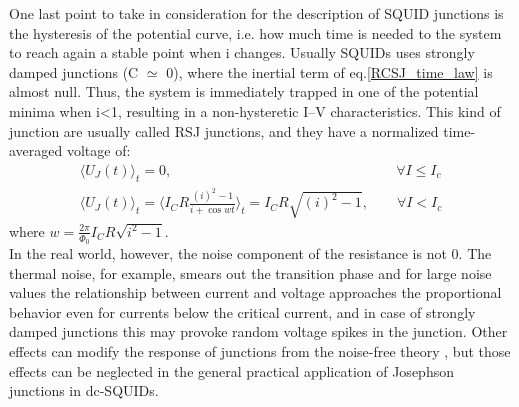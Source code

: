 \documentclass[12pt,a4paper]{report}
\begin{document}
    One last point to take in consideration for the description of SQUID junctions is the hysteresis of the potential curve, i.e. how much time is needed to the system to reach again a stable point when i changes. Usually SQUIDs uses strongly damped junctions (C $\simeq$ 0), where the inertial term of eq.\ref{RCSJ_time_law} is almost null. Thus, the system is immediately trapped in one of the potential minima when i<1, resulting in a  non-hysteretic I–V characteristics. This kind of junction are usually called RSJ junctions, and they have a normalized time-averaged voltage of:
    \begin{eqnarray}
    	\langle U_J(t)\rangle_t = 0, \qquad \qquad \qquad   \qquad \qquad \qquad \qquad \qquad\forall  I \leq I_c \\
    	\langle U_J(t)\rangle_t = \langle I_CR\frac{(i)^2-1}{i + \cos wt}\rangle_t = I_CR\sqrt{(i)^2 -1}, \qquad \forall  I < I_c
    \end{eqnarray} 
    where $w = \frac{2\pi}{\Phi_0} I_C R \sqrt{i^2-1} $.\\
    In the real world, however, the noise component of the resistance is not 0. The thermal noise, for example, smears out the transition phase and for large noise values the relationship between current and voltage approaches the proportional behavior even for currents below the critical current, and in case of strongly damped junctions this may provoke random voltage spikes in the junction. Other effects can modify the response of junctions from the noise-free theory \cite{Squid_handbook_1}, but those effects can be neglected in the general practical application of Josephson junctions in dc-SQUIDs.
\end{document}
